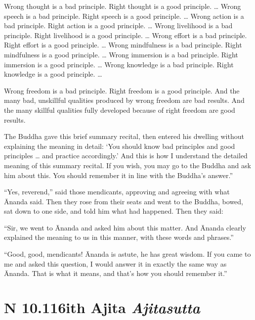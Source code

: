 \documentclass[12pt,openany]{book}%
\newcommand*{\suttatitleacronym}[1]{\smaller[2]{#1}\vspace*{.3em}}
\newcommand*{\suttatitletranslation}[1]{\linebreak{#1}}
\newcommand*{\suttatitleroot}[1]{\linebreak\smaller[2]\itshape{#1}}
\newcommand*{\tocacronym}[1]{\hspace*{-3.3em}{#1}\quad}
\newcommand*{\toctranslation}[1]{#1}
\newcommand*{\tocroot}[1]{(\textit{#1})}
\begin{document}
Wrong thought is a bad principle. Right thought is a good principle. … Wrong speech is a bad principle. Right speech is a good principle. … Wrong action is a bad principle. Right action is a good principle. … Wrong livelihood is a bad principle. Right livelihood is a good principle. … Wrong effort is a bad principle. Right effort is a good principle. … Wrong mindfulness is a bad principle. Right mindfulness is a good principle. … Wrong immersion is a bad principle. Right immersion is a good principle. … Wrong knowledge is a bad principle. Right knowledge is a good principle. … 

Wrong freedom is a bad principle. Right freedom is a good principle. And the many bad, unskillful qualities produced by wrong freedom are bad results. And the many skillful qualities fully developed because of right freedom are good results. 

The Buddha gave this brief summary recital, then entered his dwelling without explaining the meaning in detail: ‘You should know bad principles and good principles … and practice accordingly.’ And this is how I understand the detailed meaning of this summary recital. If you wish, you may go to the Buddha and ask him about this. You should remember it in line with the Buddha’s answer.” 

“Yes, reverend,” said those mendicants, approving and agreeing with what Ānanda said. Then they rose from their seats and went to the Buddha, bowed, sat down to one side, and told him what had happened. Then they said: 

“Sir, we went to Ānanda and asked him about this matter. And Ānanda clearly explained the meaning to us in this manner, with these words and phrases.” 

“Good, good, mendicants! Ānanda is astute, he has great wisdom. If you came to me and asked this question, I would answer it in exactly the same way as Ānanda. That is what it means, and that’s how you should remember it.” 

%
\section*{{\suttatitleacronym AN 10.116}{\suttatitletranslation With Ajita }{\suttatitleroot Ajitasutta}}
\addcontentsline{toc}{section}{\tocacronym{AN 10.116} \toctranslation{With Ajita } \tocroot{Ajitasutta}}
\end{document}
